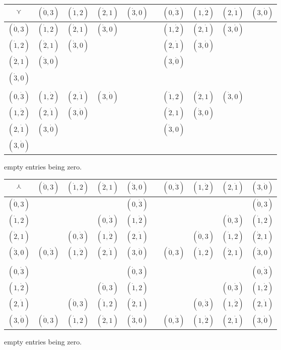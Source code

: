 \documentclass[\ifafour a4paper,12pt,\else a5paper,10pt,\fi%
onecolumn,oneside,article,%
british%
]{memoir}
\theoremstyle{remark}
\theoremstyle{innote}
\renewcommand*{\|}{\nonscript\,\vert\nonscript\;\mathopen{}}
\newcommand*{\ve}{\curlyvee}
\newcommand*{\we}{\curlywedge}
\newcommand*{\ywp}{\dot{0}}
\newcommand*{\ywl}{\dot{1}}
\newcommand*{\ywa}{\dot{2}}
\newcommand*{\ywv}{\dot{3}}
\begin{document}
{\centering
  \begin{tabular}{c|ccccccccc}
    $\ve$& $(\ywp,3)$&$(\ywl,2)$&$(\ywa,1)$&$(\ywv,0)$  &
 &$(0,\ywv)$&$(1,\ywa)$&$(2,\ywl)$&$(3,\ywp)$ \\
    \midrule
    $(\ywp,3)$&$(\ywl,2)$&$(\ywa,1)$&$(\ywv,0)$&&
 &$(1,\ywa)$&$(2,\ywl)$&$(3,\ywp)$& \\
    $(\ywl,2)$&$(\ywa,1)$&$(\ywv,0)$&&&
 &$(2,\ywl)$&$(3,\ywp)$&& \\
    $(\ywa,1)$&$(\ywv,0)$&&&&
 &$(3,\ywp)$&&& \\
    $(\ywv,0)$&&&&&
 &&&& \\
 &&&&&&&&& \\
    $(0,\ywv)$ &$(1,\ywa)$&$(2,\ywl)$&$(3,\ywp)$&&
 &$(\ywl,2)$&$(\ywa,1)$&$(\ywv,0)$& \\                                         
    $(1,\ywa)$ &$(2,\ywl)$&$(3,\ywp)$&&&
 &$(\ywa,1)$&$(\ywv,0)$&& \\                    
    $(2,\ywl)$&$(3,\ywp)$&&&&
 &$(\ywv,0)$&&& \\
 $(3,\ywp)$&&&&&&&&& 
  \end{tabular}

}
empty entries being zero.

\bigskip

{\centering
  \begin{tabular}{c|ccccccccc}
    $\we$& $(\ywp,3)$&$(\ywl,2)$&$(\ywa,1)$&$(\ywv,0)$  &
 &$(0,\ywv)$&$(1,\ywa)$&$(2,\ywl)$&$(3,\ywp)$ \\
    \midrule
    $(\ywp,3)$&&&&$(0,\ywv)$ &
     &&&&$(\ywp,3)$ \\
    $(\ywl,2)$&&&$(0,\ywv)$&$(1,\ywa)$ &
&&&$(\ywp,3)$&$(\ywl,2)$ \\
    $(\ywa,1)$&&$(0,\ywv)$&$(1,\ywa)$&$(2,\ywl)$ &
&&$(\ywp,3)$&$(\ywl,2)$&$(\ywa,1)$ \\
    $(\ywv,0)$&$(0,\ywv)$&$(1,\ywa)$&$(2,\ywl)$&$(3,\ywp)$ &
 &$(\ywp,3)$&$(\ywl,2)$&$(\ywa,1)$&$(\ywv,0)$ \\
 &&&&&&&&& \\
    $(0,\ywv)$&&&&$(\ywp,3)$ &
&&&&$(0,\ywv)$ \\                               
$(1,\ywa)$&&&$(\ywp,3)$&$(\ywl,2)$ &
&&&$(0,\ywv)$&$(1,\ywa)$ \\
 $(2,\ywl)$&&$(\ywp,3)$&$(\ywl,2)$&$(\ywa,1)$ &
 &&$(0,\ywv)$&$(1,\ywa)$&$(2,\ywl)$ \\
 $(3,\ywp)$&$(\ywp,3)$&$(\ywl,2)$&$(\ywa,1)$&$(\ywv,0)$ &
 &$(0,\ywv)$&$(1,\ywa)$&$(2,\ywl)$&$(3,\ywp)$
  \end{tabular}

}
empty entries being zero.
\end{document}

